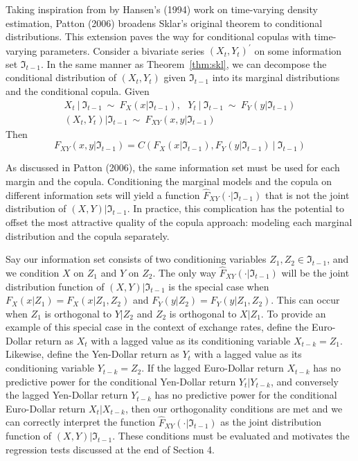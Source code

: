 \documentclass[12pt]{article}
\begin{document}
Taking inspiration from by Hansen's (1994) work on time-varying density estimation, Patton (2006) broadens Sklar's original theorem to conditional distributions. This extension paves the way for conditional copulas with time-varying parameters. Consider a bivariate series $\left(X_{t},Y_{t}\right)^{\prime}$ on some information set $\Im_{t-1}$. In the same manner as Theorem~\ref{thm:skl}, we can decompose the conditional distribution of $\left(X_{t},Y_{t}\right)$ given $\Im _{t-1}$ into its marginal distributions and the conditional copula. Given 
\begin{gather*}
X_{t}~|~\Im _{t-1}~\sim~F_{X}\left(x|\Im_{t-1}\right), ~~~ Y_{t}~|~\Im_{t-1}~\sim ~ F_{Y}\left(y|\Im_{t-1}\right) \\ \left(X_{t},Y_{t}\right) | \Im _{t-1}~ \sim ~ F_{XY}\left(x,y|\Im_{t-1}\right) 
\end{gather*}
Then
\begin{equation} \label{eqn:patton}
F_{XY}\left(x,y| \Im_{t-1}\right) = C\left(F_{X}\left(x| \Im_{t-1}\right)
,F_{Y}\left(y| \Im_{t-1}\right) ~|~ \Im_{t-1}\right)
\end{equation}

As discussed in Patton (2006), the same information set must be used for each margin and the copula. Conditioning the marginal models and the copula on different information sets will yield a function $\hat{F}_{XY}\left(\cdot|\Im_{t-1}\right)$ that is not the joint distribution of $\left(X,Y\right)|\Im_{t-1}$. In practice, this complication has the potential to offset the most attractive quality of the copula approach: modeling each marginal distribution and the copula separately.

Say our information set consists of two conditioning variables $Z_{1},Z_{2}\in\Im_{t-1}$, and we condition $X$ on $Z_{1}$ and $Y$ on $Z_{2}$. The only way $\hat{F}_{XY}\left(\cdot|\Im_{t-1}\right)$ will be the joint distribution function of $\left(X,Y\right)|\Im_{t-1}$ is the special case when $F_{X}\left(x|Z_{1}\right) = F_{X}\left(x|Z_{1},Z_{2}\right)$ and $F_{Y}\left(y|Z_{2}\right) = F_{Y}\left(y|Z_{1},Z_{2}\right)$. This can occur when $Z_{1}$ is orthogonal to $Y|Z_{2}$ and $Z_{2}$ is orthogonal to $X|Z_{1}$. To provide an example of this special case in the context of exchange rates, define the Euro-Dollar return as $X_{t}$ with a lagged value as its conditioning variable $X_{t-k} = Z_{1}$. Likewise, define the Yen-Dollar return as $Y_{t}$ with a lagged value as its conditioning variable $Y_{t-k} = Z_{2}$. If the lagged Euro-Dollar return $X_{t-k}$ has no predictive power for the conditional Yen-Dollar return $Y_{t}|Y_{t-k}$, and conversely the lagged Yen-Dollar return $Y_{t-k}$ has no predictive power for the conditional Euro-Dollar return $X_{t}|X_{t-k}$, then our orthogonality conditions are met and we can correctly interpret the function $\hat{F}_{XY}\left(\cdot|\Im_{t-1}\right)$ as the joint distribution function of $\left(X,Y\right)|\Im _{t-1}$. These conditions must be evaluated and motivates the regression tests discussed at the end of Section 4.
\end{document}
